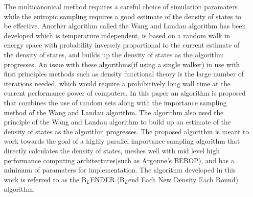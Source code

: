 \documentclass[aps,pre,reprint,superscriptaddress,showkeys]{revtex4-2}
\begin{document}
The multicanonical method requires a careful choice of simulation paramaters while the entropic sampling requires a good estimate of the density of states to be effective.  Another algorithm called the  Wang and Landau algorithm \cite{WL_phys_rev_lett,Wang_Landau_phys_rev_E} has been developed which is temperature independent, is based on a random walk in energy space with probability inversely proportional to the current estimate of the  density of states, and builds up the  density of states as the algorithm progresses.  An issue with these algorithms(if using a single walker) in use with first principles methods such as density functional theory is the large number of iterations needed, which would require a prohibitively long wall time at the current performance power of computers.  In this paper an algorithm is proposed that combines the use of random sets along with the importance sampling method of the Wang and Landau algorithm. The algorithm also used the principle of the Wang and Landau algorithm to build up an estimate of the  density of states as the algorithm progresses.  The proposed algorithm is meant to work towards the goal of a highly parallel importance sampling algorithm that directly calculates the  density of states, meshes well with mid level high performance computing architectures(such as Argonne's BEBOP), and has a minimum of paramaters for implementation. The algorithm developed in this work is referred to as the B$_{L}$ENDER (B$_{L}$end Each New Density Each Round) algorithm.
 
\end{document}
